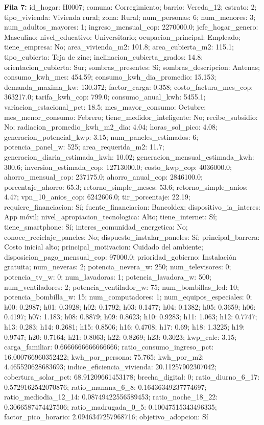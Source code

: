{\footnotesize\textbf{Fila 7:} id\_hogar: H0007; comuna: Corregimiento; barrio: Vereda\_12; estrato: 2; tipo\_vivienda: Vivienda rural; zona: Rural; num\_personas: 6; num\_menores: 3; num\_adultos\_mayores: 1; ingreso\_mensual\_cop: 2270000.0; jefe\_hogar\_genero: Masculino; nivel\_educativo: Universitario; ocupacion\_principal: Empleado; tiene\_empresa: No; area\_vivienda\_m2: 101.8; area\_cubierta\_m2: 115.1; tipo\_cubierta: Teja de zinc; inclinacion\_cubierta\_grados: 14.8; orientacion\_cubierta: Sur; sombras\_presentes: Sí; sombras\_descripcion: Antenas; consumo\_kwh\_mes: 454.59; consumo\_kwh\_dia\_promedio: 15.153; demanda\_maxima\_kw: 130.372; factor\_carga: 0.358; costo\_factura\_mes\_cop: 363217.0; tarifa\_kwh\_cop: 799.0; consumo\_anual\_kwh: 5455.1; variacion\_estacional\_pct: 18.5; mes\_mayor\_consumo: Octubre; mes\_menor\_consumo: Febrero; tiene\_medidor\_inteligente: No; recibe\_subsidio: No; radiacion\_promedio\_kwh\_m2\_dia: 4.04; horas\_sol\_pico: 4.08; generacion\_potencial\_kwp: 3.15; num\_paneles\_estimados: 6; potencia\_panel\_w: 525; area\_requerida\_m2: 11.7; generacion\_diaria\_estimada\_kwh: 10.02; generacion\_mensual\_estimada\_kwh: 300.6; inversion\_estimada\_cop: 12713000.0; costo\_kwp\_cop: 4036000.0; ahorro\_mensual\_cop: 237175.0; ahorro\_anual\_cop: 2846100.0; porcentaje\_ahorro: 65.3; retorno\_simple\_meses: 53.6; retorno\_simple\_anios: 4.47; vpn\_10\_anios\_cop: 6242606.0; tir\_porcentaje: 22.19; requiere\_financiacion: Sí; fuente\_financiacion: Bancoldex; dispositivo\_ia\_interes: App móvil; nivel\_apropiacion\_tecnologica: Alto; tiene\_internet: Sí; tiene\_smartphone: Sí; interes\_comunidad\_energetica: No; conoce\_reciclaje\_paneles: No; dispuesto\_instalar\_paneles: Sí; principal\_barrera: Costo inicial alto; principal\_motivacion: Cuidado del ambiente; disposicion\_pago\_mensual\_cop: 97000.0; prioridad\_gobierno: Instalación gratuita; num\_neveras: 2; potencia\_nevera\_w: 250; num\_televisores: 0; potencia\_tv\_w: 0; num\_lavadoras: 1; potencia\_lavadora\_w: 500; num\_ventiladores: 2; potencia\_ventilador\_w: 75; num\_bombillas\_led: 10; potencia\_bombilla\_w: 15; num\_computadores: 1; num\_equipos\_especiales: 0; h00: 0.2987; h01: 0.3928; h02: 0.1792; h03: 0.1477; h04: 0.1382; h05: 0.3659; h06: 0.4197; h07: 1.183; h08: 0.8879; h09: 0.8623; h10: 0.9283; h11: 1.063; h12: 0.7747; h13: 0.283; h14: 0.2681; h15: 0.8506; h16: 0.4708; h17: 0.69; h18: 1.3225; h19: 0.9747; h20: 0.7164; h21: 0.8063; h22: 0.8269; h23: 0.3023; kwp\_calc: 3.15; carga\_familiar: 0.6666666666666666; ratio\_consumo\_ingreso\_pct: 16.000766960352422; kwh\_por\_persona: 75.765; kwh\_por\_m2: 4.465520628683693; indice\_eficiencia\_vivienda: 20.11257902307042; cobertura\_solar\_pct: 68.91209661453178; brecha\_digital: 0; ratio\_diurno\_6\_17: 0.5729162542070876; ratio\_manana\_6\_8: 0.16436349237774697; ratio\_mediodia\_12\_14: 0.08749422556589453; ratio\_noche\_18\_22: 0.3066587474427506; ratio\_madrugada\_0\_5: 0.10047515343496335; factor\_pico\_horario: 2.0946347257968716; objetivo\_adopcion: Sí\par}
